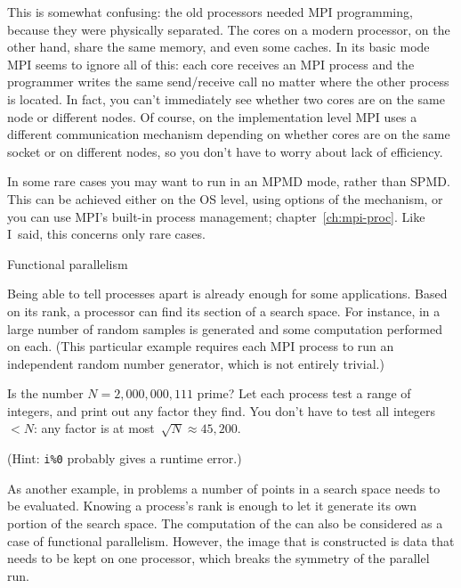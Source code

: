 This is somewhat confusing: the old processors needed MPI programming, because
they were physically separated. The cores on a modern processor, on the other hand,
share the same memory, and even some caches. In its basic mode MPI
seems to ignore all
of this: each core receives an MPI process and the programmer writes the same send/receive call no matter
where the other process is located. In fact, you can't immediately see
whether two cores are on the same node or different nodes. Of course,
on the implementation level MPI uses a different communication
mechanism depending on whether  cores are on the same socket or on
different nodes, so you don't have to worry about lack of efficiency.

\begin{remark}
  In some rare cases you may want to run in an \ac{MPMD} mode, rather
  than \ac{SPMD}. This can be achieved either on the \ac{OS} level,
  using options of the  mechanism, or you can use
  MPI's built-in process management; chapter~\ref{ch:mpi-proc}. Like
  I~said, this concerns only rare cases.
\end{remark}





 {Functional parallelism}

Being able to tell processes apart is already enough for some
applications.  Based on its rank, a processor can find its section of
a search space.  For instance, in  a
large number of random samples is generated and some computation
performed on each. (This particular example requires each MPI process
to run an independent random number generator, which is not entirely
trivial.)

\begin{exercise}
  \label{ex:primetest}
  Is the number $N=2,000,000,111$ prime?  Let each process test a
  range of integers, and print out any factor they find.  You don't
  have to test all integers~$<N$: any factor is at
  most~$\sqrt N\approx 45,200$.

  (Hint: \verb+i%0+ probably gives a runtime error.)
\end{exercise}

As another example, in  problems
a number of points in a search space needs to be evaluated. Knowing
a process's rank is enough to let it generate its own portion of the
search space. The computation of the  can
also be considered as a case of functional parallelism. However, the
image that is constructed is data that needs to be kept on one
processor, which breaks the symmetry of the parallel run.

